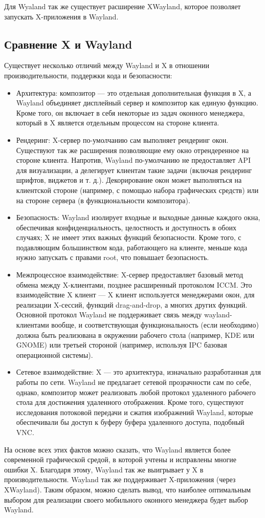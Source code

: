 Для Wyaland так же существует расширение XWayland, которое позволяет запускать X-приложения в Wayland.

\subsection{Сравнение X и Wayland}
Существует несколько отличий между Wayland и X в отношении производительности, поддержки кода и безопасности: 
\begin{itemize}
\item Архитектура: композитор --- это отдельная дополнительная функция в X, а Wayland объединяет дисплейный сервер и композитор как единую функцию. Кроме того, он включает в себя некоторые из задач оконного менеджера, который в X является отдельным процессом на стороне клиента. 
\item Рендеринг: X-сервер по-умолчанию сам выполняет рендеринг окон. Существуют так же расширения позволяющие ему окно отрендеренное на стороне клиента. Напротив, Wayland по-умолчанию не предоставляет API для визуализации, а делегирует клиентам такие задачи (включая рендеринг шрифтов, виджетов и т. д.). Декорирование окон может выполняться на клиентской стороне (например, с помощью набора графических средств) или на стороне сервера (в функциональности композитора). 
\item Безопасность: Wayland изолирует входные и выходные данные каждого окна, обеспечивая конфиденциальность, целостность и доступность в обоих случаях; X не имеет этих важных функций безопасности. Кроме того, с подавляющим большинством кода, работающего на клиенте, меньше кода нужно запускать с правами root, что повышает безопасность. 
\item Межпроцессное взаимодействие: X-сервер предоставляет базовый метод обмена между X-клиентами, позднее расширенный протоколом ICCM. Это взаимодействие X клиент --- X клиент используется менеджерами окон, для реализации X-сессий, функций drag-and-drop, а многих других функций. Основной протокол Wayland не поддерживает связь между wayland-клиентами вообще, и соответствующая функциональность (если необходимо) должна быть реализована в окружении рабочего стола (например, KDE или GNOME) или третьей стороной (например, используя IPC базовая операционной системы).
\item Сетевое взаимодействие: X --- это архитектура, изначально разработанная для работы по сети. Wayland не предлагает сетевой прозрачности сам по себе, однако, композитор может реализовать любой протокол удаленного рабочего стола для достижения удаленного отображения. Кроме того, существуют исследования потоковой передачи и сжатия изображений Wayland, которые обеспечивали бы доступ к буферу буфера удаленного доступа, подобный VNC.
\end{itemize}

На основе всех этих фактов можно сказать, что Wayland является более современной графической средой, в которой учтены и исправлены многие ошибки X. Благодаря этому, Wayland так же выигрывает у X в производительности. Wayland так же поддерживает X-приложения (через XWayland). Таким образом, можно сделать вывод, что наиболее оптимальным выбором для реализации своего мобильного оконного менеджера будет выбор Wayland.
